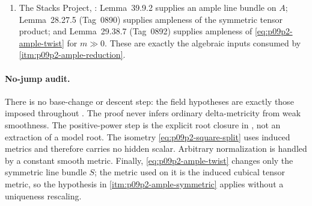 \begin{enumerate}
\item The Stacks Project, \cite{stacks-project}: Lemma~39.9.2 supplies an
ample line bundle on \(A\); Lemma~28.27.5 (Tag~0890) supplies ampleness of
the symmetric tensor product; and Lemma~29.38.7 (Tag~0892) supplies
ampleness of \eqref{eq:p09p2-ample-twist} for \(m\gg0\).  These are exactly
the algebraic inputs consumed by \cref{itm:p09p2-ample-reduction}.
\end{enumerate}

\paragraph{No-jump audit.}
There is no base-change or descent step: the field hypotheses are exactly
those imposed throughout \cite{GK17}.  The proof never infers ordinary
delta-metricity from weak smoothness.  The positive-power step is the
explicit root closure in \cite[\S9.14]{GK17}, not an extraction of a model
root.  The isometry \eqref{eq:p09p2-square-split} uses induced metrics and
therefore carries no hidden scalar.  Arbitrary normalization is handled by
a constant smooth metric.  Finally, \eqref{eq:p09p2-ample-twist} changes
only the symmetric line bundle \(S\); the metric used on it is the induced
cubical tensor metric, so the hypothesis in
\cref{itm:p09p2-ample-symmetric} applies without a uniqueness rescaling.
